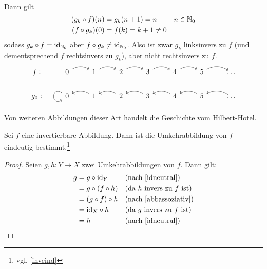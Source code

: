 \begin{bsp}
\begin{enumerate}
\begin{align*}
        \end{align*}
        Dann gilt
        \begin{align*}
            (g_k\circ f)(n)&=g_k(n+1)=n && n\in \mathbb N_0 \\
            (f\circ g_k)(0) & = f(k) = k+1 \neq 0
        \end{align*}
        sodass $g_k\circ f=\mathrm{id}_{\mathbb N_0}$ aber $f\circ g_k\neq \mathrm{id}_{\mathbb N_0}$. Also ist zwar $g_k$ linksinvers zu $f$ (und dementsprechend $f$ rechtsinvers zu $g_k$), aber nicht rechtsinvers zu $f$.
        \[\begin{tikzcd}
            f\vcentcolon & 0 \ar[r, bend left]& 1 \ar[r, bend left]& 2 \ar[r, bend left]& 3 \ar[r, bend left]& 4 \ar[r, bend left]& 5 \ar[r, bend left]& \dots \\
            g_0\vcentcolon & 0 \ar[loop, out=145, in=215, looseness=5] & 1 \ar[l, bend right] & 2 \ar[l, bend right] & 3 \ar[l, bend right] & 4  \ar[l, bend right] & 5  \ar[l, bend right] &  \ar[l, bend right]  \dots
        \end{tikzcd}\]
        Von weiteren Abbildungen dieser Art handelt die Geschichte vom \href{https://en.wikipedia.org/wiki/Hilbert\%27s_paradox_of_the_Grand_Hotel}{Hilbert-Hotel}.
    \end{enumerate}
\end{bsp}


\begin{satz}\label{umkehreind}
    Sei $f$ eine invertierbare Abbildung. Dann ist die Umkehrabbildung von $f$ eindeutig bestimmt.\footnote{vgl. \cref{inveind}}
\end{satz}
\begin{proof}
    Seien $g,h:Y\to X$ zwei Umkehrabbildungen von $f$. Dann gilt:
    \begin{align*}
        g & = g\circ \id_Y && (\text{nach \cref{idneutral}})\\
        & = g\circ (f\circ h) && (\text{da $h$ invers zu $f$ ist}) \\
        & = (g\circ f)\circ h && (\text{nach \cref{abbassoziativ}}) \\
        & = \id_X \circ h && (\text{da $g$ invers zu $f$ ist}) \\
        & = h && (\text{nach \cref{idneutral}}) \qedhere
    \end{align*}
\end{proof}


